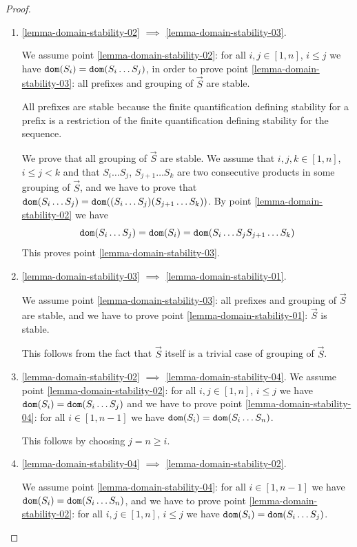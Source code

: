 \documentclass{lmcs}
\begin{document}
\begin{proof}
\begin{enumerate}
\item
\ref{lemma-domain-stability-02} $\implies$ \ref{lemma-domain-stability-03}.

We assume point \ref{lemma-domain-stability-02}: 
for all $i, j \in [1, n]$, $i \le j$ we have ${\tt dom}(S_i)  =  {\tt dom}(S_i \ldots S_j)$,
in order to prove point \ref{lemma-domain-stability-03}:
all prefixes and grouping of $\vec{S}$ are stable. 

All prefixes are stable because the finite quantification defining stability for a prefix 
is a restriction of the finite quantification defining stability for the sequence. 

We prove that all grouping of $\vec{S}$ are stable. We assume that
$i, j,k\in [1, n]$, $i \le j < k$ and that $S_i \ldots S_j$, $S_{j+1} \ldots S_k$
are two consecutive products in some grouping of $\vec{S}$, and we have to prove 
that ${\tt dom}(S_i \ldots S_j) = {\tt dom}( (S_i \ldots S_j) (S_{j+1} \ldots S_k))$. 
By point \ref{lemma-domain-stability-02} we have 
$$
{\tt dom}(S_i \ldots S_j) = {\tt dom}(S_i) = {\tt dom}(S_i \ldots S_j S_{j+1} \ldots S_k)
$$
This proves point \ref{lemma-domain-stability-03}.


\item
\ref{lemma-domain-stability-03} $\implies$ \ref{lemma-domain-stability-01}.

We assume point \ref{lemma-domain-stability-03}: all prefixes 
and grouping of $\vec{S}$ are stable,
and we have to prove point \ref{lemma-domain-stability-01}: $\vec{S}$ is stable. 

This follows from the fact that $\vec{S}$ itself is a trivial case of grouping of $\vec{S}$.


\item
\ref{lemma-domain-stability-02} $\implies$  \ref{lemma-domain-stability-04}.
We assume point \ref{lemma-domain-stability-02}:
for all $i, j \in [1, n]$, $i \le j$ we have ${\tt dom}(S_i) =  {\tt dom}(S_i \ldots S_j)$
and we have to prove point \ref{lemma-domain-stability-04}: 
for all $i \in [1, n-1]$ we have ${\tt dom}(S_i) =  {\tt dom}(S_i \ldots S_n)$.

This follows by choosing $j=n \ge i$.


\item
\ref{lemma-domain-stability-04} $\implies$  \ref{lemma-domain-stability-02}.

We assume point \ref{lemma-domain-stability-04}: 
for all $i \in [1, n-1]$ we have ${\tt dom}(S_i) =  {\tt dom}(S_i \ldots S_n)$, and we have to prove
point \ref{lemma-domain-stability-02}: 
for all $i, j \in [1, n]$, $i \le j$ we have ${\tt dom}(S_i) =  {\tt dom}(S_i \ldots S_j)$.


\end{enumerate}
\end{proof}
\end{document}
